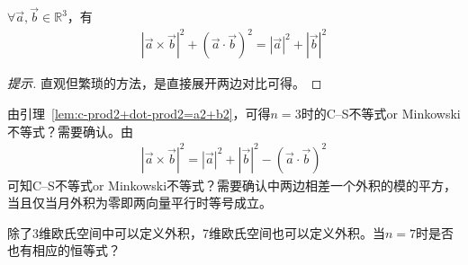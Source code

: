 \begin{lemma}\label{lem:c-prod2+dot-prod2=a2+b2}
  $\forall \vec a, \vec b\in\mathbb{R}^3$，有
  \begin{align*}
    \left|\vec a\times \vec b\right|^2 + (\vec a\cdot \vec b)^2 =
    \left|\vec a\right|^2 + \left|\vec b\right|^2
  \end{align*}
\end{lemma}
\begin{proof}[提示]
  直观但繁琐的方法，是直接展开两边对比可得。
\end{proof}

\begin{example}
  由引理~\ref{lem:c-prod2+dot-prod2=a2+b2}，可得$n=3$时的C--S不等式{\color{red}or Minkowski不等式？需要确认}。由
  \begin{align*}
    \left|\vec a\times \vec b\right|^2 = 
    \left|\vec a\right|^2 + \left|\vec b\right|^2
    - (\vec a\cdot \vec b)^2
  \end{align*}
  可知C--S不等式{\color{red}or Minkowski不等式？需要确认}中两边相差一个外积的模的平方，当且仅当月外积为零即两向量平行时等号成立。
\end{example}

\begin{question}
  除了3维欧氏空间中可以定义外积，7维欧氏空间也可以定义外积。当$n=7$时是否也有相应的恒等式？
\end{question}


